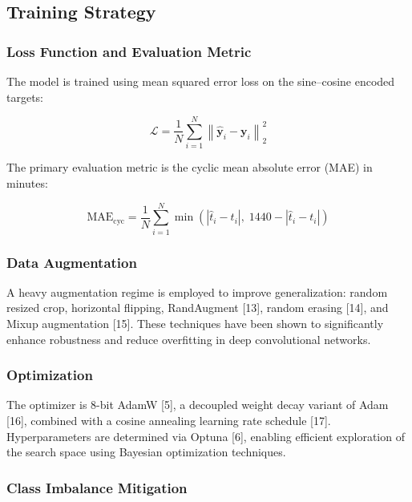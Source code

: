 \documentclass[9pt, a4paper, twocolumn]{article}
\begin{document}
\subsection{Training Strategy}

\subsubsection{Loss Function and Evaluation Metric}

The model is trained using mean squared error loss on the sine--cosine encoded targets:

\begin{equation}
\mathcal{L} = \frac{1}{N} \sum_{i=1}^{N}
    \left\| \hat{\mathbf{y}}_i - \mathbf{y}_i \right\|_2^2
\end{equation}

The primary evaluation metric is the cyclic mean absolute error (MAE) in minutes:

\begin{equation}
\text{MAE}_{\text{cyc}} = \frac{1}{N} \sum_{i=1}^{N}
    \min\!\left(|\hat{t}_i - t_i|,\; 1440 - |\hat{t}_i - t_i|\right)
\end{equation}

\subsubsection{Data Augmentation}

A heavy augmentation regime is employed to improve generalization: random resized crop, horizontal flipping, RandAugment [13], random erasing [14], and Mixup augmentation [15]. These techniques have been shown to significantly enhance robustness and reduce overfitting in deep convolutional networks.

\subsubsection{Optimization}

The optimizer is 8-bit AdamW [5], a decoupled weight decay variant of Adam [16], combined with a cosine annealing learning rate schedule [17]. Hyperparameters are determined via Optuna [6], enabling efficient exploration of the search space using Bayesian optimization techniques.

\subsubsection{Class Imbalance Mitigation}
\end{document}
